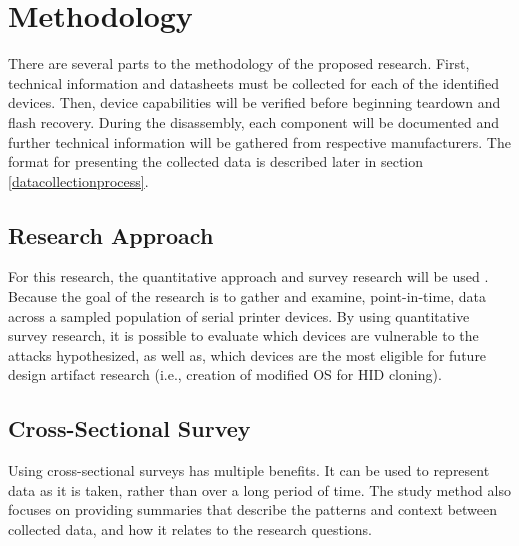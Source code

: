\section{Methodology}  \label{methodology}

There are several parts to the methodology of the proposed research. First, technical information and datasheets must be collected for each of the identified devices. Then, device capabilities will be verified before beginning teardown and flash recovery. During the disassembly, each component will be documented and further technical information will be gathered from respective manufacturers. The format for presenting the collected data is described later in section \ref{datacollectionprocess}.



\subsection{Research Approach} \label{researchapproach}

For this research, the quantitative approach and survey research will be used \autocite{babbie2017basics,creswell2017research}. Because the goal of the research is to gather and examine, point-in-time, data across a sampled population of serial printer devices. By using quantitative survey research, it is possible to evaluate which devices are vulnerable to the attacks hypothesized, as well as, which devices are the most eligible for future design artifact research (i.e., creation of modified OS for HID cloning).


\subsection{Cross-Sectional Survey} \label{casestudy}

Using cross-sectional surveys \autocite{creswell2017research} has multiple benefits. It can be used to represent data as it is taken, rather than over a long period of time.  The study method also focuses on providing summaries that describe the patterns and context between collected data, and how it relates to the research questions.



